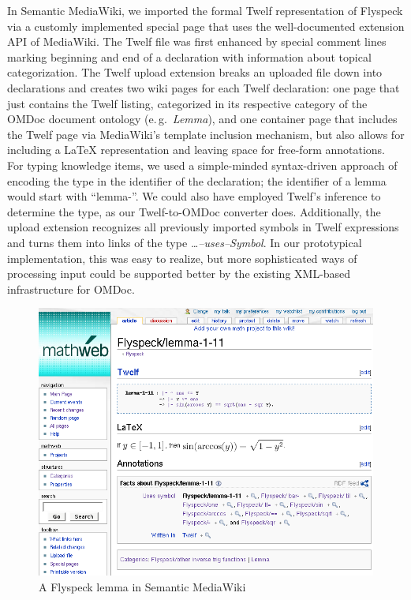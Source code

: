 \documentclass{llncs}
\begin{document}
In Semantic MediaWiki, we imported the formal Twelf representation of Flyspeck via a
customly implemented special page that uses the well-documented extension API of
MediaWiki.  The Twelf file was first enhanced by special comment lines marking beginning
and end of a declaration with information
about topical categorization.  The Twelf upload extension breaks an uploaded file down
into declarations and creates two wiki pages for each Twelf declaration: one page that
just contains the Twelf listing, categorized in its respective category of the OMDoc
document ontology (e.\,g.\ \textit{Lemma}), and one container page that includes the Twelf
page via MediaWiki's template inclusion mechanism, but also allows for including a
{\LaTeX} representation and leaving space for free-form annotations.  For typing knowledge
items, we used a simple-minded syntax-driven approach of encoding the type in the
identifier of the declaration; the identifier of a lemma would start with ``lemma-''.  We
could also have employed Twelf's inference to determine the type, as our Twelf-to-OMDoc converter does.  Additionally, the upload
extension recognizes all previously imported symbols in Twelf expressions and turns them
into links of the type \textit{\ldots--uses--Symbol}.  In our prototypical implementation,
this was easy to realize, but more sophisticated ways of processing input could be
supported better by the existing XML-based infrastructure for OMDoc.

\begin{figure}
  \centering
  \includegraphics[width=\textwidth]{smw-lemma}
  \caption{A Flyspeck lemma in Semantic MediaWiki}
  \label{fig:smw-lemma}
\end{figure}
\end{document}
